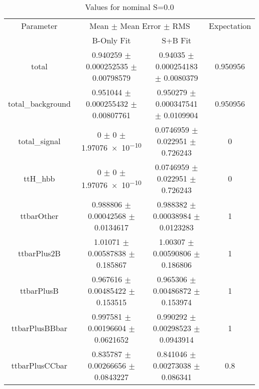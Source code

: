 \begin{table}
\centering
\caption{Values for nominal S=0.0}
\begin{tabular}{cccc}
\toprule
Parameter & \multicolumn{2}{c}{Mean $\pm$ Mean Error $\pm$ RMS} & Expectation\\
 & B-Only Fit & S+B Fit & \\
\midrule
total & \num{0.940259} $\pm$ \num{0.000252535} $\pm$ \num{0.00798579} & \num{0.94035} $\pm$ \num{0.000254183} $\pm$ \num{0.0080379} & \num{0.950956}\\
total\_background & \num{0.951044} $\pm$ \num{0.000255432} $\pm$ \num{0.00807761} & \num{0.950279} $\pm$ \num{0.000347541} $\pm$ \num{0.0109904} & \num{0.950956}\\
total\_signal & \num{0} $\pm$ \num{0} $\pm$ \num{1.97076e-10} & \num{0.0746959} $\pm$ \num{0.022951} $\pm$ \num{0.726243} & \num{0}\\
ttH\_hbb & \num{0} $\pm$ \num{0} $\pm$ \num{1.97076e-10} & \num{0.0746959} $\pm$ \num{0.022951} $\pm$ \num{0.726243} & \num{0}\\
ttbarOther & \num{0.988806} $\pm$ \num{0.00042568} $\pm$ \num{0.0134617} & \num{0.988382} $\pm$ \num{0.00038984} $\pm$ \num{0.0123283} & \num{1}\\
ttbarPlus2B & \num{1.01071} $\pm$ \num{0.00587838} $\pm$ \num{0.185867} & \num{1.00307} $\pm$ \num{0.00590806} $\pm$ \num{0.186806} & \num{1}\\
ttbarPlusB & \num{0.967616} $\pm$ \num{0.00485422} $\pm$ \num{0.153515} & \num{0.965306} $\pm$ \num{0.00486872} $\pm$ \num{0.153974} & \num{1}\\
ttbarPlusBBbar & \num{0.997581} $\pm$ \num{0.00196604} $\pm$ \num{0.0621652} & \num{0.990292} $\pm$ \num{0.00298523} $\pm$ \num{0.0943914} & \num{1}\\
ttbarPlusCCbar & \num{0.835787} $\pm$ \num{0.00266656} $\pm$ \num{0.0843227} & \num{0.841046} $\pm$ \num{0.00273038} $\pm$ \num{0.086341} & \num{0.8}\\
\bottomrule
\end{tabular}
\end{table}